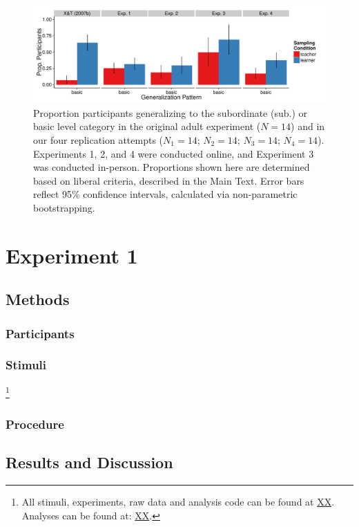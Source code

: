 \documentclass[man]{apa2}
\begin{document}
 \begin{figure} [t]
 \begin{center} 
  \includegraphics[width=6.5in]{figures/FIG_2.pdf} 
  \caption{\label{fig:bar_plots} Proportion participants generalizing to the subordinate (sub.) or basic level category in the original adult experiment ($N = 14$) and in our four replication attempts ($N_{1} = 14$; $N_{2} = 14$; $N_{3}  = 14$; $N_{4}  = 14$).  Experiments 1, 2, and 4 were conducted online, and Experiment 3 was conducted in-person. Proportions shown here are determined based on liberal criteria, described in the Main Text. Error bars reflect 95\% confidence intervals, calculated via non-parametric bootstrapping. } 
 \end{center} 
\end{figure}

  
\section{Experiment 1}

\subsection{Methods}

\subsubsection{Participants} 
\subsubsection{Stimuli}
\footnote{All stimuli, experiments, raw data and analysis code can be found at \url{XX}. 
Analyses can be found at: \url{XX}.} 


\subsubsection{Procedure}

\subsection{Results and Discussion}
\end{document}
